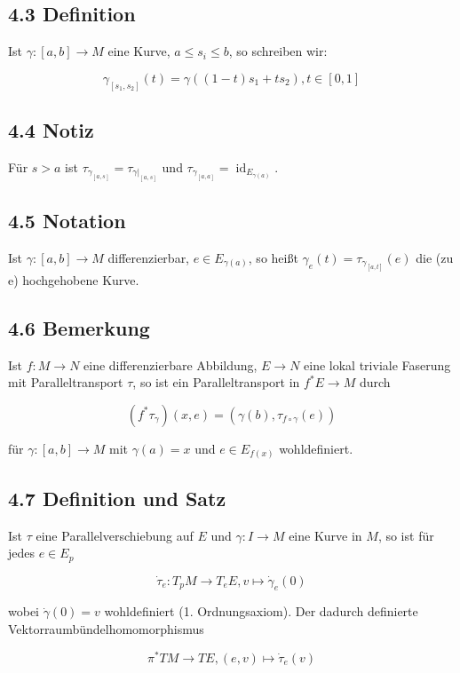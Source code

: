 \subsection*{4.3 Definition}
Ist $\gamma:[a, b] \rightarrow M$ eine Kurve, $a \leq s_{i} \leq b$, so schreiben wir:

$$
\gamma_{\left[s_{1}, s_{2}\right]}(t)=\gamma\left((1-t) s_{1}+t s_{2}\right), t \in[0,1]
$$

\subsection*{4.4 Notiz}
Für $s>a$ ist $\tau_{\gamma_{[a, s]}}=\tau_{\left.\gamma\right|_{[a, s]}}$ und $\tau_{\gamma_{[a, a]}}=\operatorname{id}_{E_{\gamma(a)}}$.

\subsection*{4.5 Notation}
Ist $\gamma:[a, b] \rightarrow M$ differenzierbar, $e \in E_{\gamma(a)}$, so heißt $\gamma_{e}(t)=\tau_{\gamma_{[a, t]}}(e)$ die (zu e) hochgehobene Kurve.

\subsection*{4.6 Bemerkung}
Ist $f: M \rightarrow N$ eine differenzierbare Abbildung, $E \rightarrow N$ eine lokal triviale Faserung mit Paralleltransport $\tau$, so ist ein Paralleltransport in $f^{*} E \rightarrow M$ durch

$$
\left(f^{*} \tau_{\gamma}\right)(x, e)=\left(\gamma(b), \tau_{f \circ \gamma}(e)\right)
$$

für $\gamma:[a, b] \rightarrow M$ mit $\gamma(a)=x$ und $e \in E_{f(x)}$ wohldefiniert.

\subsection*{4.7 Definition und Satz}
Ist $\tau$ eine Parallelverschiebung auf $E$ und $\gamma: I \rightarrow M$ eine Kurve in $M$, so ist für jedes $e \in E_{p}$

$$
\dot{\tau}_{e}: T_{p} M \rightarrow T_{e} E, v \mapsto \dot{\gamma}_{e}(0)
$$

wobei $\dot{\gamma}(0)=v$ wohldefiniert (1. Ordnungsaxiom). Der dadurch definierte Vektorraumbündelhomomorphismus

$$
\pi^{*} T M \rightarrow T E,(e, v) \mapsto \dot{\tau}_{e}(v)
$$

